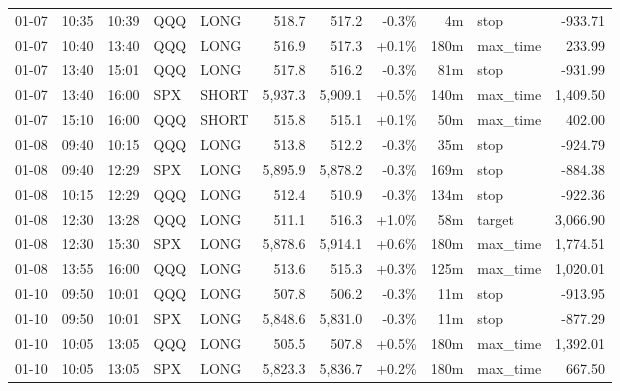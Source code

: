 \documentclass[11pt,a4paper,twoside]{article}
\begin{document}
\begin{center}
\begin{longtable}{>{\color{txtmain}}l l l l l r r r r >{\color{txtmain}}l r}
01-07 & 10:35 & 10:39 & QQQ & LONG & 518.7 & 517.2 & \textcolor{lossred}{-0.3\%} & 4m & stop & \textcolor{lossred}{-933.71} \\
01-07 & 10:40 & 13:40 & QQQ & LONG & 516.9 & 517.3 & \textcolor{wingreen}{+0.1\%} & 180m & max\_time & \textcolor{wingreen}{233.99} \\
01-07 & 13:40 & 15:01 & QQQ & LONG & 517.8 & 516.2 & \textcolor{lossred}{-0.3\%} & 81m & stop & \textcolor{lossred}{-931.99} \\
01-07 & 13:40 & 16:00 & SPX & SHORT & 5,937.3 & 5,909.1 & \textcolor{wingreen}{+0.5\%} & 140m & max\_time & \textcolor{wingreen}{1,409.50} \\
01-07 & 15:10 & 16:00 & QQQ & SHORT & 515.8 & 515.1 & \textcolor{wingreen}{+0.1\%} & 50m & max\_time & \textcolor{wingreen}{402.00} \\
01-08 & 09:40 & 10:15 & QQQ & LONG & 513.8 & 512.2 & \textcolor{lossred}{-0.3\%} & 35m & stop & \textcolor{lossred}{-924.79} \\
01-08 & 09:40 & 12:29 & SPX & LONG & 5,895.9 & 5,878.2 & \textcolor{lossred}{-0.3\%} & 169m & stop & \textcolor{lossred}{-884.38} \\
01-08 & 10:15 & 12:29 & QQQ & LONG & 512.4 & 510.9 & \textcolor{lossred}{-0.3\%} & 134m & stop & \textcolor{lossred}{-922.36} \\
01-08 & 12:30 & 13:28 & QQQ & LONG & 511.1 & 516.3 & \textcolor{wingreen}{+1.0\%} & 58m & target & \textcolor{wingreen}{3,066.90} \\
01-08 & 12:30 & 15:30 & SPX & LONG & 5,878.6 & 5,914.1 & \textcolor{wingreen}{+0.6\%} & 180m & max\_time & \textcolor{wingreen}{1,774.51} \\
01-08 & 13:55 & 16:00 & QQQ & LONG & 513.6 & 515.3 & \textcolor{wingreen}{+0.3\%} & 125m & max\_time & \textcolor{wingreen}{1,020.01} \\
01-10 & 09:50 & 10:01 & QQQ & LONG & 507.8 & 506.2 & \textcolor{lossred}{-0.3\%} & 11m & stop & \textcolor{lossred}{-913.95} \\
01-10 & 09:50 & 10:01 & SPX & LONG & 5,848.6 & 5,831.0 & \textcolor{lossred}{-0.3\%} & 11m & stop & \textcolor{lossred}{-877.29} \\
01-10 & 10:05 & 13:05 & QQQ & LONG & 505.5 & 507.8 & \textcolor{wingreen}{+0.5\%} & 180m & max\_time & \textcolor{wingreen}{1,392.01} \\
01-10 & 10:05 & 13:05 & SPX & LONG & 5,823.3 & 5,836.7 & \textcolor{wingreen}{+0.2\%} & 180m & max\_time & \textcolor{wingreen}{667.50} \\

\end{longtable}
\end{center}
\end{document}
